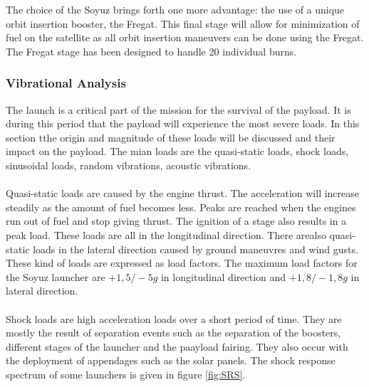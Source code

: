 The choice of the Soyuz brings forth one more advantage: the use of a unique orbit insertion booster, the Fregat. This final stage will allow for minimization of fuel on the satellite as all orbit insertion maneuvers can be done using the Fregat. The Fregat stage has been designed to handle 20 individual burns.

\subsubsection{Vibrational Analysis}
\label{frLVCA}

The launch is a critical part of the mission for the survival of the payload. It is during this period that the payload will experience the most severe loads.
In this section tthe origin and magnitude of these loads will be discussed and their impact on the payload. The mian loads are the quasi-static loads, shock loads, sinusoidal loads, random vibrations, acoustic vibrations.
\\ \\
Quasi-static loads are caused by the engine thrust. The acceleration will increase steadily as the amount of fuel becomes less. Peaks are reached when the engines run out of fuel and stop giving thrust. The ignition of a stage also results in a peak load. These loads are all in the longitudinal direction. There arealso quasi-static loads in the lateral direction caused by ground maneuvres and wind gusts. These kind of loads are expressed as load factors. The maximum load factors for the Soyuz launcher are $+1,5/-5 g$ in longitudinal direction and $+1,8/-1,8 g$ in lateral direction.
\\ \\
Shock loads are high acceleration loads over a short period of time. They are mostly the result of separation events such as the separation of the boosters, different stages of the launcher and the paayload fairing. They also occur with the deployment of appendages such as the solar panels. The shock response spectrum of some launchers is given in figure \ref{fig:SRS}.


